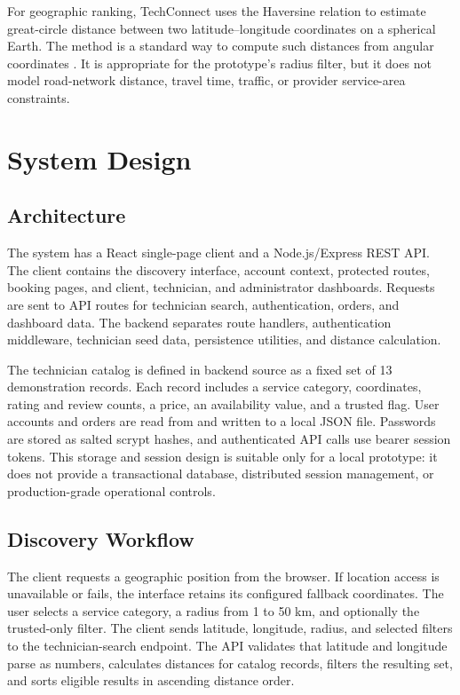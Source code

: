 \documentclass[conference]{IEEEtran}
\begin{document}
For geographic ranking, TechConnect uses the Haversine relation to estimate great-circle distance between two latitude--longitude coordinates on a spherical Earth. The method is a standard way to compute such distances from angular coordinates \cite{sinnott1984}. It is appropriate for the prototype's radius filter, but it does not model road-network distance, travel time, traffic, or provider service-area constraints.

\section{System Design}
\subsection{Architecture}
The system has a React single-page client and a Node.js/Express REST API. The client contains the discovery interface, account context, protected routes, booking pages, and client, technician, and administrator dashboards. Requests are sent to API routes for technician search, authentication, orders, and dashboard data. The backend separates route handlers, authentication middleware, technician seed data, persistence utilities, and distance calculation.

The technician catalog is defined in backend source as a fixed set of 13 demonstration records. Each record includes a service category, coordinates, rating and review counts, a price, an availability value, and a trusted flag. User accounts and orders are read from and written to a local JSON file. Passwords are stored as salted scrypt hashes, and authenticated API calls use bearer session tokens. This storage and session design is suitable only for a local prototype: it does not provide a transactional database, distributed session management, or production-grade operational controls.

\subsection{Discovery Workflow}
The client requests a geographic position from the browser. If location access is unavailable or fails, the interface retains its configured fallback coordinates. The user selects a service category, a radius from 1 to 50 km, and optionally the trusted-only filter. The client sends latitude, longitude, radius, and selected filters to the technician-search endpoint. The API validates that latitude and longitude parse as numbers, calculates distances for catalog records, filters the resulting set, and sorts eligible results in ascending distance order.
\end{document}
